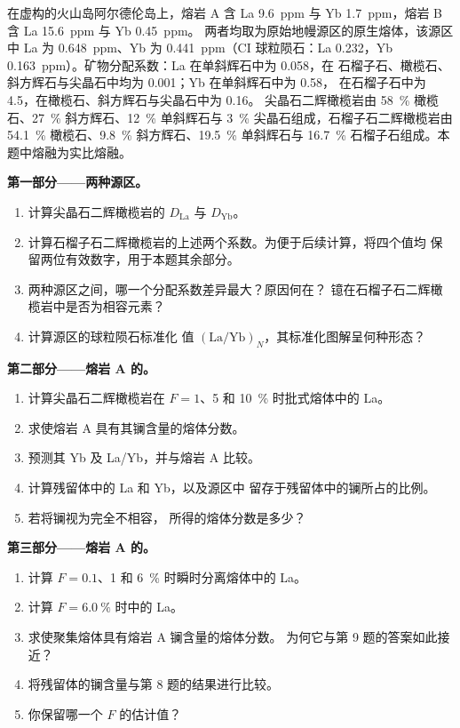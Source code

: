 \begin{problem}\label{pb:b3:trace-element-modelling:1}
在虚构的火山岛阿尔德伦岛上，熔岩 A 含 La \qty{9.6}{ppm}
与 Yb \qty{1.7}{ppm}，熔岩 B 含 La \qty{15.6}{ppm} 与 Yb \qty{0.45}{ppm}。
两者均取为原始地幔源区的原生熔体，该源区中
La 为 \qty{0.648}{ppm}、Yb 为 \qty{0.441}{ppm}（CI 球粒陨石：La 0.232，Yb
\qty{0.163}{ppm}）。矿物分配系数：La 在单斜辉石中为 0.058，在
石榴子石、橄榄石、斜方辉石与尖晶石中均为 0.001；Yb 在单斜辉石中为 0.58，
在石榴子石中为 4.5，在橄榄石、斜方辉石与尖晶石中为 0.16。
尖晶石二辉橄榄岩由 \qty{58}{\percent} 橄榄石、\qty{27}{\percent} 斜方辉石、\qty{12}{\percent}
单斜辉石与 \qty{3}{\percent} 尖晶石组成，石榴子石二辉橄榄岩由 \qty{54.1}{\percent} 橄榄石、\qty{9.8}{\percent}
斜方辉石、\qty{19.5}{\percent} 单斜辉石与 \qty{16.7}{\percent} 石榴子石组成。本题中熔融为实比熔融。

\medskip\noindent\textbf{第一部分——两种源区。}
\begin{enumerate}
\item 计算尖晶石二辉橄榄岩的 $D_{\mathrm{La}}$ 与 $D_{\mathrm{Yb}}$。
\item 计算石榴子石二辉橄榄岩的上述两个系数。为便于后续计算，将四个值均
保留两位有效数字，用于本题其余部分。
\item 两种源区之间，哪一个分配系数差异最大？原因何在？
镱在石榴子石二辉橄榄岩中是否为相容元素？
\item 计算源区的球粒陨石标准化
值 $(\mathrm{La}/\mathrm{Yb})_N$，其标准化图解呈何种形态？
\end{enumerate}

\medskip\noindent\textbf{第二部分——熔岩 A 的。}
\begin{enumerate}[resume]
\item 计算尖晶石二辉橄榄岩在 $F = 1$、5 和
\qty{10}{\percent} 时批式熔体中的 La。
\item 求使熔岩 A 具有其镧含量的熔体分数。
\item 预测其 Yb 及 La/Yb，并与熔岩 A 比较。
\item 计算残留体中的 La 和 Yb，以及源区中
留存于残留体中的镧所占的比例。
\item 若将镧视为完全不相容，
所得的熔体分数是多少？
\end{enumerate}

\medskip\noindent\textbf{第三部分——熔岩 A 的。}
\begin{enumerate}[resume]
\item 计算 $F = 0.1$、1 和
\qty{6}{\percent} 时瞬时分离熔体中的 La。
\item 计算 $F = \qty{6.0}{\percent}$ 时中的 La。
\item 求使聚集熔体具有熔岩 A 镧含量的熔体分数。
为何它与第 9 题的答案如此接近？
\item 将残留体的镧含量与第 8 题的结果进行比较。
\item 你保留哪一个 $F$ 的估计值？
\end{enumerate}


\end{problem}
